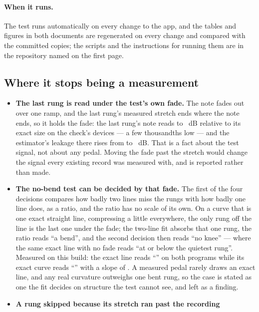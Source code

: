 \documentclass[11pt,a4paper]{article}
\begin{document}
\paragraph{When it runs.} The test runs automatically on every change to the app, and the tables
and figures in both documents are regenerated on every change and
compared with the committed copies; the scripts and the instructions for
running them are in the repository named on the first page.

\subsection{Where it stops being a measurement}

\begin{itemize}
  \item \textbf{The last rung is read under the test's own fade.} The
  note fades out over one ramp, and the last rung's measured stretch ends
  where the note ends, so it holds the fade: the last rung's note reads
  \cparityWorstFade{} to \cparityLeastFade{}~dB relative to its exact size
  on the check's devices --- a few thousandths low --- and the estimator's leakage there rises from
  \cparityLeakageOne{} to \cparityFadeLeakageOne{}~dB. That is a fact about
  the test signal, not about any pedal. Moving the fade past the stretch
  would change the signal every existing record was measured with, and is
  reported rather than made.
  \item \textbf{The no-bend test can be decided by that fade.} The first
  of the four decisions compares how badly two lines miss the rungs with
  how badly one line does, as a ratio, and the ratio has no scale of its
  own. On a curve that is one exact straight line, compressing a little
  everywhere, the only rung off the line is the last one under the fade;
  the two-line fit absorbs that one rung, the ratio reads ``a bend'', and
  the second decision then reads ``no knee'' --- where the same exact line
  with no fade reads ``at or below the quietest rung''. Measured on this
  build: the exact line reads ``\cparityLineMeasuredKnee'' on both programs
  while its exact curve reads ``\cparityLineTruthKnee'' with a slope of
  \cparityLineTruthPreSlope{}. A measured pedal rarely draws an exact
  line, and any real curvature outweighs one bent rung, so the case is
  stated as one the fit decides on structure the test cannot see, and
  left as a finding.
  \item \textbf{A rung skipped because its stretch ran past the recording
}
\end{itemize}
\end{document}
